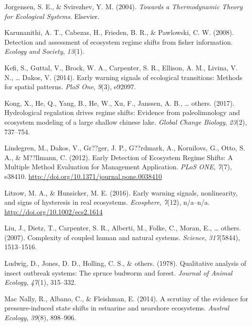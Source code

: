 \documentclass[12pt,twoside,openany]{reedthesis}
\begin{document}
\leavevmode\hypertarget{ref-jorgensen_towards_2004}{}%
Jorgensen, S. E., \& Svirezhev, Y. M. (2004). \emph{Towards a Thermodynamic Theory for Ecological Systems}. Elsevier.

\leavevmode\hypertarget{ref-karunanithi_detection_2008}{}%
Karunanithi, A. T., Cabezas, H., Frieden, B. R., \& Pawlowski, C. W. (2008). Detection and assessment of ecosystem regime shifts from fisher information. \emph{Ecology and Society}, \emph{13}(1).

\leavevmode\hypertarget{ref-kefi2014early}{}%
Kefi, S., Guttal, V., Brock, W. A., Carpenter, S. R., Ellison, A. M., Livina, V. N., \ldots{} Dakos, V. (2014). Early warning signals of ecological transitions: Methods for spatial patterns. \emph{PloS One}, \emph{9}(3), e92097.

\leavevmode\hypertarget{ref-kong2017hydrological}{}%
Kong, X., He, Q., Yang, B., He, W., Xu, F., Janssen, A. B., \ldots{} others. (2017). Hydrological regulation drives regime shifts: Evidence from paleolimnology and ecosystem modeling of a large shallow chinese lake. \emph{Global Change Biology}, \emph{23}(2), 737--754.

\leavevmode\hypertarget{ref-lindegren_early_2012}{}%
Lindegren, M., Dakos, V., Gr??ger, J. P., G??rdmark, A., Kornilovs, G., Otto, S. A., \& M??llmann, C. (2012). Early Detection of Ecosystem Regime Shifts: A Multiple Method Evaluation for Management Application. \emph{PLoS ONE}, \emph{7}(7), e38410. \url{http://doi.org/10.1371/journal.pone.0038410}

\leavevmode\hypertarget{ref-litzow_early_2016}{}%
Litzow, M. A., \& Hunsicker, M. E. (2016). Early warning signals, nonlinearity, and signs of hysteresis in real ecosystems. \emph{Ecosphere}, \emph{7}(12), n/a--n/a. \url{http://doi.org/10.1002/ecs2.1614}

\leavevmode\hypertarget{ref-liu_complexity_2007}{}%
Liu, J., Dietz, T., Carpenter, S. R., Alberti, M., Folke, C., Moran, E., \ldots{} others. (2007). Complexity of coupled human and natural systems. \emph{Science}, \emph{317}(5844), 1513--1516.

\leavevmode\hypertarget{ref-ludwig1978qualitative}{}%
Ludwig, D., Jones, D. D., Holling, C. S., \& others. (1978). Qualitative analysis of insect outbreak systems: The spruce budworm and forest. \emph{Journal of Animal Ecology}, \emph{47}(1), 315--332.

\leavevmode\hypertarget{ref-mac2014scrutiny}{}%
Mac Nally, R., Albano, C., \& Fleishman, E. (2014). A scrutiny of the evidence for pressure-induced state shifts in estuarine and nearshore ecosystems. \emph{Austral Ecology}, \emph{39}(8), 898--906.
\end{document}
